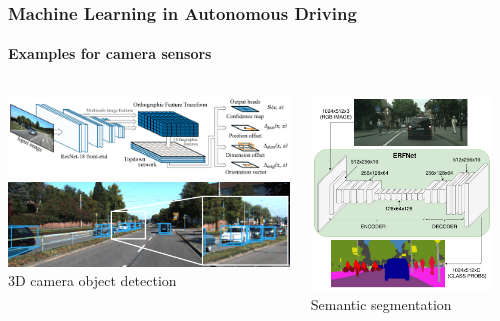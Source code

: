 \begin{frame}
\frametitle{Machine Learning in Autonomous Driving}
\framesubtitle{Examples for camera sensors}
\begin{columns}[]
    \begin{column}{0.6\textwidth}
        \centering
        \includegraphics[width=\textwidth]{images/roddick_3d_camera_network.png}\\
        \includegraphics[width=\textwidth]{images/roddick_3d_camera_detections.png}\\
        \vspace{0.1cm}
        \footnotesize{3D camera object detection \cite{Roddick2019}}
    \end{column}
    \begin{column}{0.4\textwidth}
        \centering
        \includegraphics[width=0.9\textwidth]{images/erfnet_semantic_segmentation.png}\\
        \footnotesize{Semantic segmentation \cite{Romera2018}}
    \end{column}
\end{columns}
\end{frame}

